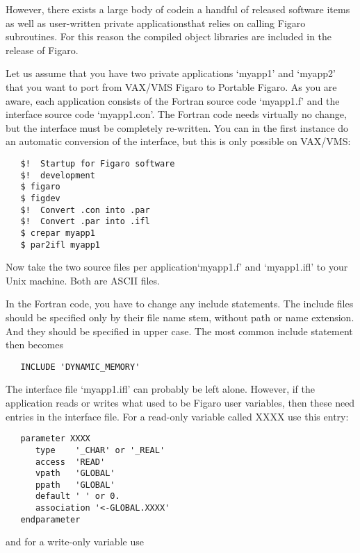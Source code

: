    However, there exists a large body of code\latorhtm{---}{-}in a
   handful of released
   software items as well as user-written private
   applications\latorhtm{---}{-}that
   relies on calling Figaro subroutines. For this reason the compiled
   object libraries are included in the release of Figaro.

   Let us assume that you have two private applications `myapp1' and
   `myapp2' that you want to port from VAX/VMS Figaro to Portable
   Figaro. As you are aware, each application consists of the
   Fortran source code `myapp1.f' and the interface source code
   `myapp1.con'. The Fortran code needs virtually no change, but the
   interface must be completely re-written. You can in the first
   instance do an automatic conversion of the interface, but this is
   only possible on VAX/VMS:

\begin{verbatim}
   $!  Startup for Figaro software
   $!  development
   $ figaro
   $ figdev
   $!  Convert .con into .par
   $!  Convert .par into .ifl
   $ crepar myapp1
   $ par2ifl myapp1
\end{verbatim}

   Now take the two source files per application\latorhtm{---}{-}`myapp1.f'
   and `myapp1.ifl' to your Unix machine. Both are ASCII files.

   In the Fortran code, you have to change any include statements. The
   include files should be specified only by their file name stem,
   without path or name extension. And they should be specified in upper
   case. The most common include statement then becomes

\begin{verbatim}
   INCLUDE 'DYNAMIC_MEMORY'
\end{verbatim}

   The interface file `myapp1.ifl' can probably be left alone.
   However, if the application reads or writes what used to be Figaro
   user variables, then these need entries in the interface file. For a
   read-only variable called XXXX use this entry:

\begin{verbatim}
   parameter XXXX
      type    '_CHAR' or '_REAL'
      access  'READ'
      vpath   'GLOBAL'
      ppath   'GLOBAL'
      default ' ' or 0.
      association '<-GLOBAL.XXXX'
   endparameter
\end{verbatim}

   and for a write-only variable use

